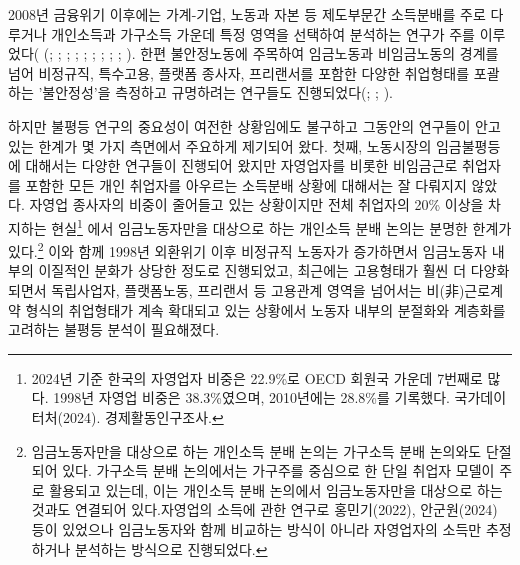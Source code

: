 \documentclass[
  letterpaper,
  DIV=11,
  numbers=noendperiod]{scrartcl}
\begin{document}
2008년 금융위기 이후에는 가계-기업, 노동과 자본 등 제도부문간 소득분배를
주로 다루거나 개인소득과 가구소득 가운데 특정 영역을 선택하여 분석하는
연구가 주를 이루었다( (; ;
;
;
;
;
;
;
;
). 한편 불안정노동에
주목하여 임금노동과 비임금노동의 경계를 넘어 비정규직, 특수고용, 플랫폼
종사자, 프리랜서를 포함한 다양한 취업형태를 포괄하는 '불안정성'을
측정하고 규명하려는 연구들도
진행되었다(;
;
).

하지만 불평등 연구의 중요성이 여전한 상황임에도 불구하고 그동안의
연구들이 안고 있는 한계가 몇 가지 측면에서 주요하게 제기되어 왔다. 첫째,
노동시장의 임금불평등에 대해서는 다양한 연구들이 진행되어 왔지만
자영업자를 비롯한 비임금근로 취업자를 포함한 모든 개인 취업자를 아우르는
소득분배 상황에 대해서는 잘 다뤄지지 않았다. 자영업 종사자의 비중이
줄어들고 있는 상황이지만 전체 취업자의 20\% 이상을 차지하는
현실\footnote{2024년 기준 한국의 자영업자 비중은 22.9\%로 OECD 회원국
  가운데 7번째로 많다. 1998년 자영업 비중은 38.3\%였으며, 2010년에는
  28.8\%를 기록했다. 국가데이터처(2024). 경제활동인구조사.} 에서
임금노동자만을 대상으로 하는 개인소득 분배 논의는 분명한 한계가
있다.\footnote{임금노동자만을 대상으로 하는 개인소득 분배 논의는
  가구소득 분배 논의와도 단절되어 있다. 가구소득 분배 논의에서는
  가구주를 중심으로 한 단일 취업자 모델이 주로 활용되고 있는데, 이는
  개인소득 분배 논의에서 임금노동자만을 대상으로 하는 것과도 연결되어
  있다.자영업의 소득에 관한 연구로 홍민기(2022), 안군원(2024) 등이
  있었으나 임금노동자와 함께 비교하는 방식이 아니라 자영업자의 소득만
  추정하거나 분석하는 방식으로 진행되었다.} 이와 함께 1998년 외환위기
이후 비정규직 노동자가 증가하면서 임금노동자 내부의 이질적인 분화가
상당한 정도로 진행되었고, 최근에는 고용형태가 훨씬 더 다양화되면서
독립사업자, 플랫폼노동, 프리랜서 등 고용관계 영역을 넘어서는
비(非)근로계약 형식의 취업형태가 계속 확대되고 있는 상황에서 노동자
내부의 분절화와 계층화를 고려하는 불평등 분석이 필요해졌다.
\end{document}
